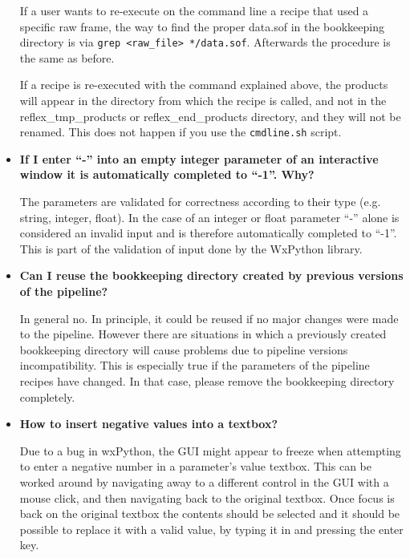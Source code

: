 \begin{itemize}
   If a user wants to re-execute on the command line a recipe that used
   a specific raw frame, the way to find the proper data.sof in the bookkeeping
   directory is via {\tt grep <raw\_file> */data.sof}. 
   Afterwards the procedure is the same 
   as before.

   If a recipe is re-executed with the command explained above, the
   products will appear in the directory from which the recipe
   is called, and not in the reflex\_tmp\_products or reflex\_end\_products
   directory, and they will not be renamed. This does not happen if you use
   the {\tt cmdline.sh} script.

\ifx{}\undefined
\else

   \item {\bf If I enter ``-'' into an empty integer parameter of an interactive
   window it is automatically completed to ``-1''. Why? }

   The parameters are validated for correctness according to their type 
   (e.g. string, integer, float). In the case of an integer or float parameter 
   ``-'' alone is considered an invalid input and is therefore automatically
   completed to ``-1''.  This is part of the validation of input done
   by the WxPython library.

\fi

\item {\bf Can I reuse the bookkeeping directory created by previous
    versions of the pipeline?}

  In general no. In principle, it could be reused if no major changes
  were made to the pipeline. However there are situations in which a
  previously created bookkeeping directory will cause problems due to
  pipeline versions incompatibility. This is especially true if the
  parameters of the pipeline recipes have changed. In that case,
  please remove the bookkeeping directory completely.

\item {\bf How to insert negative values into a textbox?}

  Due to a bug in wxPython, the GUI might appear to freeze when attempting to
  enter a negative number in a parameter's value textbox. This can be worked
  around by navigating away to a different control in the GUI with a mouse
  click, and then navigating back to the original textbox. Once focus is back
  on the original textbox the contents should be selected and it should be
  possible to replace it with a valid value, by typing it in and pressing the
  enter key.


\end{itemize}
